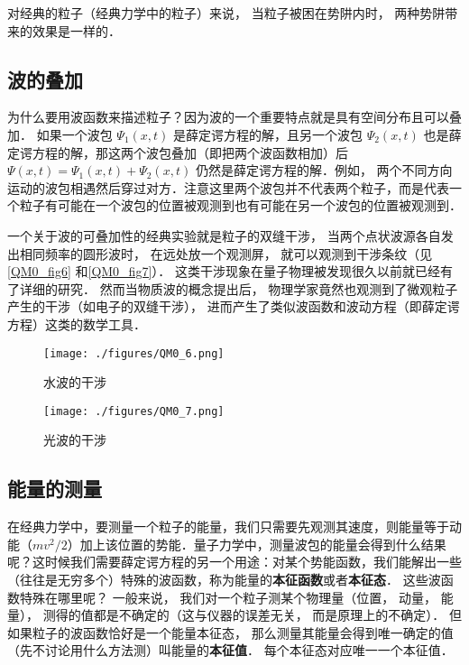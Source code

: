 对经典的粒子（经典力学中的粒子）来说， 当粒子被困在势阱内时， 两种势阱带来的效果是一样的．


\subsection{波的叠加}
为什么要用波函数来描述粒子？因为波的一个重要特点就是具有空间分布且可以叠加． 如果一个波包 $\Psi_1(x, t)$ 是薛定谔方程的解，且另一个波包 $\Psi_2(x, t)$ 也是薛定谔方程的解，那这两个波包叠加（即把两个波函数相加）后 $\Psi(x, t) = \Psi_1(x, t) + \Psi_2(x, t)$ 仍然是薛定谔方程的解．例如， 两个不同方向运动的波包相遇然后穿过对方．注意这里两个波包并不代表两个粒子，而是代表一个粒子有可能在一个波包的位置被观测到也有可能在另一个波包的位置被观测到．

一个关于波的可叠加性的经典实验就是粒子的双缝干涉， 当两个点状波源各自发出相同频率的圆形波时， 在远处放一个观测屏， 就可以观测到干涉条纹（见\autoref{QM0_fig6} 和\autoref{QM0_fig7}）． 这类干涉现象在量子物理被发现很久以前就已经有了详细的研究． 然而当物质波的概念提出后， 物理学家竟然也观测到了微观粒子产生的干涉（如电子的双缝干涉）， 进而产生了类似波函数和波动方程（即薛定谔方程）这类的数学工具．

\begin{figure}[ht]
\centering
\texttt{[image: ./figures/QM0\_6.png]}
\caption{水波的干涉} \label{QM0_fig6}
\end{figure}

\begin{figure}[ht]
\centering
\texttt{[image: ./figures/QM0\_7.png]}
\caption{光波的干涉} \label{QM0_fig7}
\end{figure}


\subsection{能量的测量}
在经典力学中，要测量一个粒子的能量，我们只需要先观测其速度，则能量等于动能（$mv^2/2$）加上该位置的势能．量子力学中，测量波包的能量会得到什么结果呢？这时候我们需要薛定谔方程的另一个用途：对某个势能函数，我们能解出一些（往往是无穷多个）特殊的波函数，称为能量的\textbf{本征函数}或者\textbf{本征态}． 这些波函数特殊在哪里呢？ 一般来说， 我们对一个粒子测某个物理量（位置， 动量， 能量）， 测得的值都是不确定的（这与仪器的误差无关， 而是原理上的不确定）． 但如果粒子的波函数恰好是一个能量本征态， 那么测量其能量会得到唯一确定的值（先不讨论用什么方法测）叫能量的\textbf{本征值}． 每个本征态对应唯一一个本征值．


